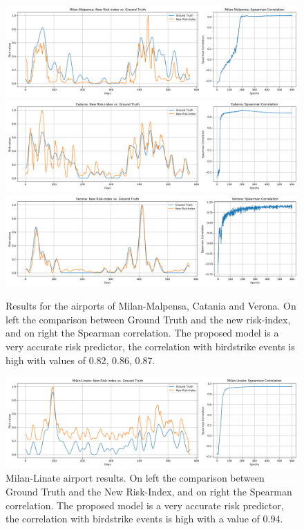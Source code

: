 \begin{figure}
	\centering
	\includegraphics[width=14cm]{img/malpensa.png}
	\includegraphics[width=14cm]{img/catania.png}
	\includegraphics[width=14cm]{img/verona.png}
	\caption{Results for the airports of Milan-Malpensa, Catania and Verona. On left the comparison between Ground Truth and the new risk-index, and on right the Spearman correlation. The proposed model is a very accurate risk predictor, the correlation with birdstrike events is high with values of 0.82, 0.86, 0.87.}
	\label{MAL_CA_VE_results}
\end{figure}

\begin{figure}
	\centering
	\includegraphics[width=13.8cm]{img/LI.png}
	\caption{Milan-Linate airport results. On left the comparison between Ground Truth and the New Risk-Index, and on right the Spearman correlation.  The proposed model is a very accurate risk predictor, the correlation with birdstrike events is high with a value of 0.94.}
	\label{LI_results}
\end{figure}


